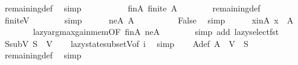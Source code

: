 \begin{isabellebody}
\ remaining{\isacharunderscore}{\kern0pt}def\ \isamarkupfalse%
\ simp\isanewline
\ \ \ \ \isanewline
\ \ \ \ \isamarkupfalse%
\ finA{\isacharcolon}{\kern0pt}\ {\isachardoublequoteopen}finite\ {\isacharquery}{\kern0pt}A{\isachardoublequoteclose}\isanewline
\ \ \ \ \ \ \isamarkupfalse%
\ remaining{\isacharunderscore}{\kern0pt}def\isanewline
\ \ \ \ \ \ \isamarkupfalse%
\ finite{\isacharunderscore}{\kern0pt}V\isanewline
\ \ \ \ \ \ \isamarkupfalse%
\ simp\isanewline
\isanewline
\ \ \ \ \isamarkupfalse%
\ neA{\isacharcolon}{\kern0pt}\ {\isachardoublequoteopen}{\isacharquery}{\kern0pt}A\ {\isasymnoteq}\ {\isacharbraceleft}{\kern0pt}{\isacharbraceright}{\kern0pt}{\isachardoublequoteclose}\isanewline
\ \ \ \ \ \ \isamarkupfalse%
\ False\ \isamarkupfalse%
\ simp\isanewline
\isanewline
\ \ \ \ \isamarkupfalse%
\ x{\isacharunderscore}{\kern0pt}inA{\isacharcolon}{\kern0pt}\ {\isachardoublequoteopen}{\isacharquery}{\kern0pt}x\ {\isasymin}\ {\isacharquery}{\kern0pt}A{\isachardoublequoteclose}\isanewline
\ \ \ \ \ \ \isamarkupfalse%
\ lazy{\isacharunderscore}{\kern0pt}argmax{\isacharunderscore}{\kern0pt}gain{\isacharunderscore}{\kern0pt}mem{\isacharbrackleft}{\kern0pt}OF\ finA\ neA{\isacharbrackright}{\kern0pt}\isanewline
\ \ \ \ \ \ \isamarkupfalse%
\ {\isacharparenleft}{\kern0pt}simp\ add{\isacharcolon}{\kern0pt}\ lazy{\isacharunderscore}{\kern0pt}select{\isacharunderscore}{\kern0pt}fst{\isacharparenright}{\kern0pt}\isanewline
\isanewline
\ \ \ \ \isamarkupfalse%
\ SsubV{\isacharcolon}{\kern0pt}\ {\isachardoublequoteopen}{\isacharquery}{\kern0pt}S\ {\isasymsubseteq}\ V{\isachardoublequoteclose}\isanewline
\ \ \isamarkupfalse%
\ lazy{\isacharunderscore}{\kern0pt}state{\isacharunderscore}{\kern0pt}subset{\isacharunderscore}{\kern0pt}V{\isacharbrackleft}{\kern0pt}of\ i{\isacharbrackright}{\kern0pt}\ \isamarkupfalse%
\ simp\isanewline
\isanewline
\ \ \isamarkupfalse%
\ A{\isacharunderscore}{\kern0pt}def{\isacharcolon}{\kern0pt}\ {\isachardoublequoteopen}{\isacharquery}{\kern0pt}A\ {\isacharequal}{\kern0pt}\ V\ {\isacharminus}{\kern0pt}\ {\isacharquery}{\kern0pt}S{\isachardoublequoteclose}\isanewline
\ \ \ \ \isamarkupfalse%
\ remaining{\isacharunderscore}{\kern0pt}def\ \isamarkupfalse%
\ simp\isanewline
\isanewline
\ \ \isamarkupfalse%

\end{isabellebody}
